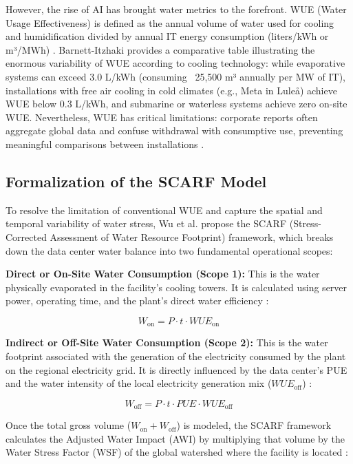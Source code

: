 \documentclass[conference]{IEEEtran}
\begin{document}
However, the rise of AI has brought water metrics to the forefront. WUE (Water Usage Effectiveness) is defined as the annual volume of water used for cooling and humidification divided by annual IT energy consumption (liters/kWh or m³/MWh) \cite{Barnett2026}. Barnett-Itzhaki \cite{Barnett2026} provides a comparative table illustrating the enormous variability of WUE according to cooling technology: while evaporative systems can exceed 3.0 L/kWh (consuming ~25,500 m³ annually per MW of IT), installations with free air cooling in cold climates (e.g., Meta in Luleå) achieve WUE below 0.3 L/kWh, and submarine or waterless systems achieve zero on-site WUE. Nevertheless, WUE has critical limitations: corporate reports often aggregate global data and confuse withdrawal with consumptive use, preventing meaningful comparisons between installations \cite{Barnett2026}.

\subsection{Formalization of the SCARF Model}

To resolve the limitation of conventional WUE and capture the spatial and temporal variability of water stress, Wu et al. \cite{Wu2025} propose the SCARF (Stress-Corrected Assessment of Water Resource Footprint) framework, which breaks down the data center water balance into two fundamental operational scopes:

\textbf{Direct or On-Site Water Consumption (Scope 1):} This is the water physically evaporated in the facility's cooling towers. It is calculated using server power, operating time, and the plant's direct water efficiency \cite{Wu2025}:

\begin{equation}
W_{\text{on}} = P \cdot t \cdot WUE_{\text{on}}
\end{equation}

\textbf{Indirect or Off-Site Water Consumption (Scope 2):} This is the water footprint associated with the generation of the electricity consumed by the plant on the regional electricity grid. It is directly influenced by the data center's PUE and the water intensity of the local electricity generation mix ($WUE_{\text{off}}$) \cite{Wu2025}:

\begin{equation}
W_{\text{off}} = P \cdot t \cdot PUE \cdot WUE_{\text{off}}
\end{equation}

Once the total gross volume ($W_{\text{on}} + W_{\text{off}}$) is modeled, the SCARF framework calculates the Adjusted Water Impact (AWI) by multiplying that volume by the Water Stress Factor (WSF) of the global watershed where the facility is located \cite{Wu2025}:
\end{document}
